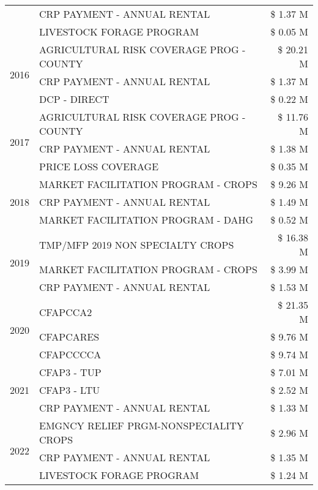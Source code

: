 \begin{tabular}{llr}
 & CRP PAYMENT - ANNUAL RENTAL & \$ 1.37 M \\
 & LIVESTOCK FORAGE PROGRAM & \$ 0.05 M \\
\cline{1-3}
\multirow[t]{3}{*}{2016} & AGRICULTURAL RISK COVERAGE PROG - COUNTY & \$ 20.21 M \\
 & CRP PAYMENT - ANNUAL RENTAL & \$ 1.37 M \\
 & DCP - DIRECT & \$ 0.22 M \\
\cline{1-3}
\multirow[t]{3}{*}{2017} & AGRICULTURAL RISK COVERAGE PROG - COUNTY & \$ 11.76 M \\
 & CRP PAYMENT - ANNUAL RENTAL & \$ 1.38 M \\
 & PRICE LOSS COVERAGE & \$ 0.35 M \\
\cline{1-3}
\multirow[t]{3}{*}{2018} & MARKET FACILITATION PROGRAM - CROPS & \$ 9.26 M \\
 & CRP PAYMENT - ANNUAL RENTAL & \$ 1.49 M \\
 & MARKET FACILITATION PROGRAM - DAHG & \$ 0.52 M \\
\cline{1-3}
\multirow[t]{3}{*}{2019} & TMP/MFP 2019 NON SPECIALTY CROPS & \$ 16.38 M \\
 & MARKET FACILITATION PROGRAM - CROPS & \$ 3.99 M \\
 & CRP PAYMENT - ANNUAL RENTAL & \$ 1.53 M \\
\cline{1-3}
\multirow[t]{3}{*}{2020} & CFAPCCA2 & \$ 21.35 M \\
 & CFAPCARES & \$ 9.76 M \\
 & CFAPCCCCA & \$ 9.74 M \\
\cline{1-3}
\multirow[t]{3}{*}{2021} & CFAP3 - TUP & \$ 7.01 M \\
 & CFAP3 - LTU & \$ 2.52 M \\
 & CRP PAYMENT - ANNUAL RENTAL & \$ 1.33 M \\
\cline{1-3}
\multirow[t]{3}{*}{2022} & EMGNCY RELIEF PRGM-NONSPECIALITY CROPS & \$ 2.96 M \\
 & CRP PAYMENT - ANNUAL RENTAL & \$ 1.35 M \\
 & LIVESTOCK FORAGE PROGRAM & \$ 1.24 M \\
\cline{1-3}
\bottomrule
\end{tabular}
